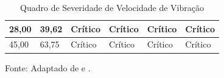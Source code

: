 \documentclass[conference]{IEEEtran}
\begin{document}
\begin{table}[!t]
\begin{tabular}{|C{1.05cm}|C{1.05cm}|C{1.05cm}|C{1.05cm}|C{1.05cm}|C{1.05cm}|}
28,00 & 39,62 &
 Crítico &
 Crítico &
 Crítico &
 Crítico \\
\hline

45,00 & 63,75 &
 Crítico &
 Crítico &
 Crítico &
 Crítico \\
\hline

\end{tabular}

\vspace{0.1cm}
\caption{Quadro de Severidade de Velocidade de Vibração}

\label{quadro:severidade}

{\footnotesize Fonte: Adaptado de \cite{santos2023analise} e \cite{iso10816}.}

\end{table}
\end{document}
